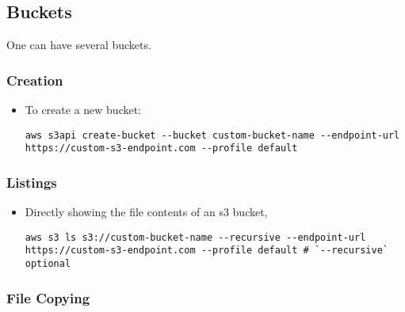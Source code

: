 \documentclass[12pt, a4paper]{article}
\numberwithin{equation}{section}
\theoremstyle{definition}
\theoremstyle{definition}
\begin{document}
	\subsection{Buckets}
	
	One can have several buckets. 
	
	\subsubsection{Creation}

	\begin{itemize}
		
		\item To create a new bucket:
		
		\begin{lstlisting}[style=mystylebash, label=alg:aws__new_bucket, xleftmargin=\parindent]
			aws s3api create-bucket --bucket custom-bucket-name --endpoint-url https://custom-s3-endpoint.com --profile default
		\end{lstlisting}
	
	\end{itemize} 

	\subsubsection{Listings}

	\begin{itemize} 
		
		\item Directly showing the file contents of an s3 bucket,
		
		\begin{lstlisting}[style=mystylebash, label=alg:aws__bucket_ls, xleftmargin=\parindent]
			aws s3 ls s3://custom-bucket-name --recursive --endpoint-url https://custom-s3-endpoint.com --profile default # `--recursive` optional
		\end{lstlisting}
		
	\end{itemize}

	\subsubsection{File Copying}
	
\end{document}
